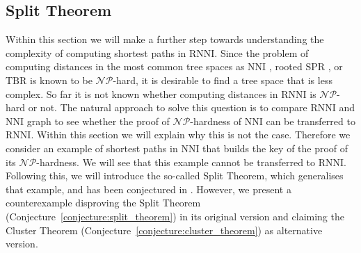 \documentclass{amsart}
\newcommand{\np}{\mathcal{NP}}
\newcommand{\nni}{\mathrm{NNI}}
\newcommand{\rnni}{\mathrm{RNNI}}
\newcommand{\tbr}{\mathrm{TBR}}
\newcommand{\spr}{\mathrm{SPR}}
\begin{document}
%
%

\subsection{Split Theorem}
\label{section:split_theorem}

Within this section we will make a further step towards understanding the complexity of computing shortest paths in $\rnni$.
Since the problem of computing distances in the most common tree spaces as $\nni$ \autocite{Dasgupta2000-xa}, rooted $\spr$ \autocite{Bordewich2005-nx}, or $\tbr$ \autocite{Allen2001-ky} is known to be $\np$-hard, it is desirable to find a tree space that is less complex.
So far it is not known whether computing distances in $\rnni$ is $\np$-hard or not.
The natural approach to solve this question is to compare $\rnni$ and $\nni$ graph to see whether the proof of $\np$-hardness of $\nni$ can be transferred to $\rnni$.
Within this section we will explain why this is not the case.
Therefore we consider an example of shortest paths in $\nni$ that builds the key of the proof of its $\np$-hardness.
We will see that this example cannot be transferred to $\rnni$.
Following this, we will introduce the so-called Split Theorem, which generalises that example, and has been conjectured in \autocite{Gavryushkin2018-ol}.
However, we present a counterexample disproving the Split Theorem (Conjecture~\ref{conjecture:split_theorem}) in its original version and claiming the Cluster Theorem (Conjecture~\ref{conjecture:cluster_theorem}) as alternative version.
\end{document}

